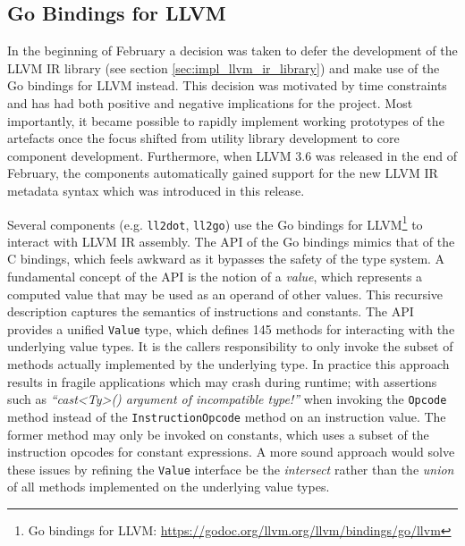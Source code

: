 
\subsection{Go Bindings for LLVM}
\label{sec:impl_go_bindings_for_llvm}

In the beginning of February a decision was taken to defer the development of the LLVM IR library (see section \ref{sec:impl_llvm_ir_library}) and make use of the Go bindings for LLVM instead. This decision was motivated by time constraints and has had both positive and negative implications for the project. Most importantly, it became possible to rapidly implement working prototypes of the artefacts once the focus shifted from utility library development to core component development. Furthermore, when LLVM 3.6 was released in the end of February, the components automatically gained support for the new LLVM IR metadata syntax which was introduced in this release.

Several components (e.g. \texttt{ll2dot}, \texttt{ll2go}) use the Go bindings for LLVM\footnote{Go bindings for LLVM: \url{https://godoc.org/llvm.org/llvm/bindings/go/llvm}} to interact with LLVM IR assembly. The API of the Go bindings mimics that of the C bindings, which feels awkward as it bypasses the safety of the type system. A fundamental concept of the API is the notion of a \textit{value}, which represents a computed value that may be used as an operand of other values. This recursive description captures the semantics of instructions and constants. The API provides a unified \texttt{Value} type, which defines 145 methods for interacting with the underlying value types. It is the callers responsibility to only invoke the subset of methods actually implemented by the underlying type. In practice this approach results in fragile applications which may crash during runtime; with assertions such as \textit{``cast<Ty>() argument of incompatible type!''} when invoking the \texttt{Opcode} method instead of the \texttt{InstructionOpcode} method on an instruction value. The former method may only be invoked on constants, which uses a subset of the instruction opcodes for constant expressions. A more sound approach would solve these issues by refining the \texttt{Value} interface be the \textit{intersect} rather than the \textit{union} of all methods implemented on the underlying value types.

